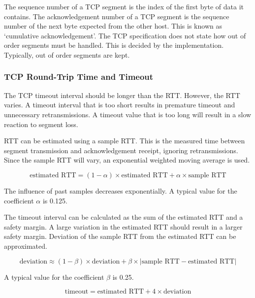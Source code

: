 The sequence number of a TCP segment is the index of the first byte of data it contains.
The acknowledgement number of a TCP segment is the sequence number of the next byte expected from the other host.
This is known as `cumulative acknowledgement'.
The TCP specification does not state how out of order segments must be handled.
This is decided by the implementation.
Typically, out of order segments are kept.

\subsubsection{TCP Round-Trip Time and Timeout}

The TCP timeout interval should be longer than the RTT.
However, the RTT varies.
A timeout interval that is too short results in premature timeout and unnecessary retransmissions.
A timeout value that is too long will result in a slow reaction to segment loss.

RTT can be estimated using a sample RTT.
This is the measured time between segment transmission and acknowledgement receipt, ignoring retransmissions.
Since the sample RTT will vary, an exponential weighted moving average is used.

\begin{equation*}
  \text{estimated RTT} = \left( 1 - \alpha \right) \times \text{estimated RTT} + \alpha \times \text{sample RTT}
\end{equation*}

The influence of past samples decreases exponentially.
A typical value for the coefficient \(\alpha\) is \num{0.125}.

The timeout interval can be calculated as the sum of the estimated RTT and a safety margin.
A large variation in the estimated RTT should result in a larger safety margin.
Deviation of the sample RTT from the estimated RTT can be approximated.

\begin{equation*}
  \text{deviation} \approx (1 - \beta) \times \text{deviation} + \beta \times \left| \text{sample RTT} - \text{estimated RTT} \right|
\end{equation*}

A typical value for the coefficient \(\beta\) is \num{0.25}.

\begin{equation*}
  \text{timeout} = \text{estimated RTT} + 4 \times \text{deviation}
\end{equation*}

